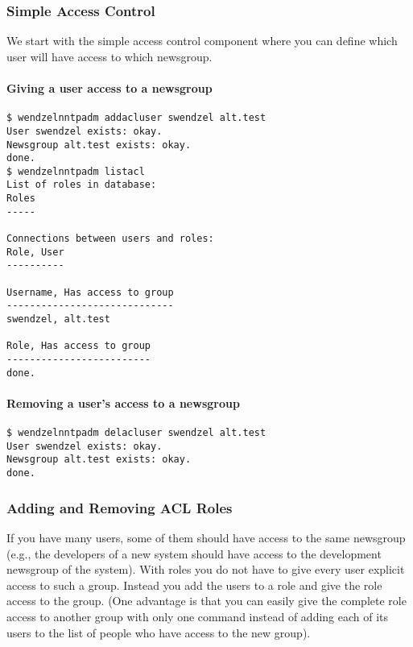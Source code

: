 \documentclass[12pt,fleqn,leqno]{scrbook}
\begin{document}
\hypertarget{simple-access-control-1}{%
\subsubsection{Simple Access Control}\label{simple-access-control-1}}

We start with the simple access control component where you can define
which user will have access to which newsgroup.

\hypertarget{giving-a-user-access-to-a-newsgroup-1}{%
\paragraph{Giving a user access to a
newsgroup}\label{giving-a-user-access-to-a-newsgroup-1}}

\begin{verbatim}
$ wendzelnntpadm addacluser swendzel alt.test
User swendzel exists: okay.
Newsgroup alt.test exists: okay.
done.
$ wendzelnntpadm listacl
List of roles in database:
Roles
-----

Connections between users and roles:
Role, User
----------

Username, Has access to group
-----------------------------
swendzel, alt.test

Role, Has access to group
-------------------------
done.
\end{verbatim}

\hypertarget{removing-a-users-access-to-a-newsgroup-1}{%
\paragraph{Removing a user's access to a
newsgroup}\label{removing-a-users-access-to-a-newsgroup-1}}

\begin{verbatim}
$ wendzelnntpadm delacluser swendzel alt.test
User swendzel exists: okay.
Newsgroup alt.test exists: okay.
done.
\end{verbatim}

\hypertarget{adding-and-removing-acl-roles-1}{%
\subsubsection{Adding and Removing ACL
Roles}\label{adding-and-removing-acl-roles-1}}

If you have many users, some of them should have access to the same
newsgroup (e.g., the developers of a new system should have access to
the development newsgroup of the system). With roles you do not have to
give every user explicit access to such a group. Instead you add the
users to a role and give the role access to the group. (One advantage is
that you can easily give the complete role access to another group with
only one command instead of adding each of its users to the list of
people who have access to the new group).
\end{document}

